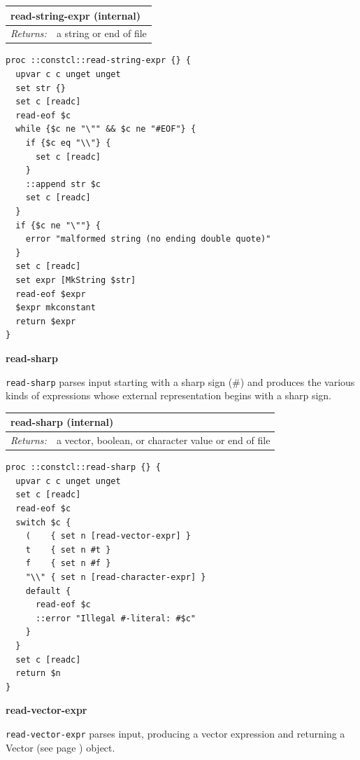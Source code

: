 \documentclass[twoside,9pt]{report}
\begin{document}
\begin{tabular}{ |l l| }
\hline
\multicolumn{2}{|l|}{read-string-expr (internal)} \\
\hline
\textit{Returns:} & a string or end of file \\
\hline
\end{tabular}

\noindent\makebox[\linewidth]{\rule{\linewidth}{0.4pt}}
\begin{lstlisting}
proc ::constcl::read-string-expr {} {
  upvar c c unget unget
  set str {}
  set c [readc]
  read-eof $c
  while {$c ne "\"" && $c ne "#EOF"} {
    if {$c eq "\\"} {
      set c [readc]
    }
    ::append str $c
    set c [readc]
  }
  if {$c ne "\""} {
    error "malformed string (no ending double quote)"
  }
  set c [readc]
  set expr [MkString $str]
  read-eof $expr
  $expr mkconstant
  return $expr
}
\end{lstlisting}
\noindent\makebox[\linewidth]{\rule{\linewidth}{0.4pt}}

\textbf{read-sharp}


\texttt{read-sharp} parses input starting with a sharp sign (\#) and produces the various kinds of expressions whose external representation begins with a sharp sign.

\begin{tabular}{ |l l| }
\hline
\multicolumn{2}{|l|}{read-sharp (internal)} \\
\hline
\textit{Returns:} & a vector, boolean, or character value or end of file \\
\hline
\end{tabular}

\noindent\makebox[\linewidth]{\rule{\linewidth}{0.4pt}}
\begin{lstlisting}
proc ::constcl::read-sharp {} {
  upvar c c unget unget
  set c [readc]
  read-eof $c
  switch $c {
    (    { set n [read-vector-expr] }
    t    { set n #t }
    f    { set n #f }
    "\\" { set n [read-character-expr] }
    default {
      read-eof $c
      ::error "Illegal #-literal: #$c"
    }
  }
  set c [readc]
  return $n
}
\end{lstlisting}
\noindent\makebox[\linewidth]{\rule{\linewidth}{0.4pt}}

\textbf{read-vector-expr}


\texttt{read-vector-expr} parses input, producing a vector expression and returning a Vector (see page \pageref{vectors}) object.
\end{document}
